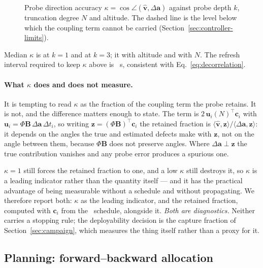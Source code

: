 \begin{figure}[!tbp]
  \centering
  \caption{Probe direction accuracy $\kappa=\cos\angle(\hat{\mathbf v},
  \Delta\mathbf a)$ against probe depth $k$, truncation degree $N$ and
  altitude. The dashed line is the level below which the coupling term cannot
  be carried (Section~\ref{sec:controller-limits}).}
  \label{fig:probe}
\end{figure}

 Median $\kappa$ is  at $k=1$ and  at
$k=3$; it  with altitude and  with $N$.
The refresh interval required to keep $\kappa$ above  is
~s, consistent with Eq.~\eqref{eq:decorrelation}.

\paragraph{What $\kappa$ does and does not measure.} It is tempting to read
$\kappa$ as the fraction of the coupling term the probe retains. It is not,
and the difference matters enough to state. The term is
$2\,\mathbf u_i(N)^{\top}\mathbf c_i$ with
$\mathbf u_i=\Phi\mathbf B\,\Delta\mathbf a\,\Delta t_i$, so writing
$\mathbf z=(\Phi\mathbf B)^{\top}\mathbf c_i$ the retained fraction is
$\langle\hat{\mathbf v},\mathbf z\rangle/
 \langle\Delta\mathbf a,\mathbf z\rangle$: it depends on the angles the true
and estimated defects make with $\mathbf z$, not on the angle between them,
because $\Phi\mathbf B$ does not preserve angles. Where
$\Delta\mathbf a\perp\mathbf z$ the true contribution vanishes and any probe
error produces a spurious one.

$\kappa=1$ still forces the retained fraction to one, and a low $\kappa$ still
destroys it, so $\kappa$ is a leading indicator rather than the quantity
itself --- and it has the practical advantage of being measurable without a
schedule and without propagating. We therefore report both: $\kappa$ as the
leading indicator, and the retained fraction, computed with $\mathbf c_i$ from
the \Asens\ schedule, alongside it. \emph{Both are diagnostics.} Neither
carries a stopping rule; the deployability decision is the capture fraction of
Section~\ref{sec:campaign}, which measures the thing itself rather than a
proxy for it. 

\subsection{Planning: forward--backward allocation}
\label{sec:controller-ifbda}

